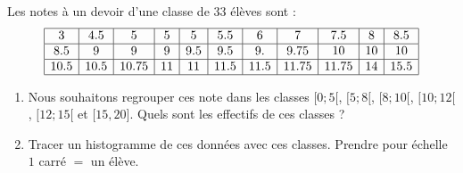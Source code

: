 
\begin{exercice}\label{exosmath-0668}

    Les notes à un devoir d'une classe de \( 33\) élèves sont :
    \begin{equation*}
        \begin{array}[]{|c|c|c|c|c|c|c|c|c|c|c|}
            \hline
            3&4.5    &5&5&5&5.5&6&7&7.5   &8&8.5\\
            \hline
            8.5&9&9&9&9.5&9.5&9.&9.75    &10&10&10\\
            \hline
            10.5&10.5&10.75&11&11&11.5&11.5&11.75&11.75&14&15.5\\
            \hline
        \end{array}
    \end{equation*}
    \begin{enumerate}
        \item
            Nous souhaitons regrouper ces note dans les classes \( \mathopen[ 0 ;5 [\), \( \mathopen[ 5 ;8 [\), \( \mathopen[ 8 ; 10 [\), \( \mathopen[ 10; 12 [\), \( \mathopen[ 12 ; 15 [\) et \( \mathopen[ 15 , 20 \mathclose]\). Quels sont les effectifs de ces classes ?
        \item
            Tracer un histogramme de ces données avec ces classes. Prendre pour échelle \( 1\) carré \( =\) un élève.
    \end{enumerate}

\end{exercice}
